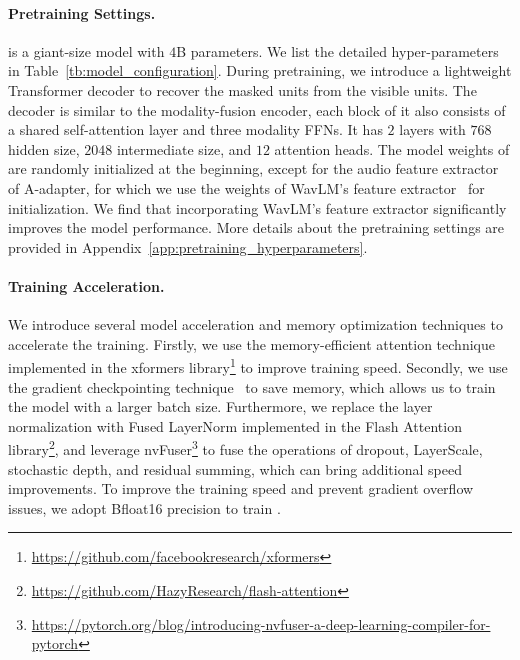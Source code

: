 \paragraph{Pretraining Settings.}

\onepeace is a giant-size model with $4$B parameters. We list the detailed hyper-parameters in Table~\ref{tb:model_configuration}. 
During pretraining, we introduce a lightweight Transformer decoder to recover the masked units from the visible units. The decoder is similar to the modality-fusion encoder, each block of it also consists of a shared self-attention layer and three modality FFNs.
It has $2$ layers with $768$ hidden size, $2048$ intermediate size, and $12$ attention heads.
The model weights of \onepeace are randomly initialized at the beginning, except for the audio feature extractor of A-adapter, for which we use the weights of WavLM's feature extractor~\cite{wavlm} for initialization. 
We find that incorporating WavLM's feature extractor significantly improves the model performance.
More details about the pretraining settings are provided in Appendix~\ref{app:pretraining_hyperparameters}.

\paragraph{Training Acceleration.}
We introduce several model acceleration and memory optimization techniques to accelerate the training.
Firstly, we use the memory-efficient attention technique~\cite{memory_efficient_attn,flash_attn} implemented in the xformers library\footnote{\url{https://github.com/facebookresearch/xformers}} to improve training speed.
Secondly, we use the gradient checkpointing technique~\cite{checkpointing} to save memory, which allows us to train the model with a larger batch size.
Furthermore, we replace the layer normalization with Fused LayerNorm implemented in the Flash Attention library\footnote{\url{https://github.com/HazyResearch/flash-attention}}, and leverage nvFuser\footnote{\url{https://pytorch.org/blog/introducing-nvfuser-a-deep-learning-compiler-for-pytorch}} to fuse the operations of dropout, LayerScale, stochastic depth, and residual summing, which can bring additional speed improvements.
To improve the training speed and prevent gradient overflow issues, we adopt Bfloat16 precision to train \onepeace.